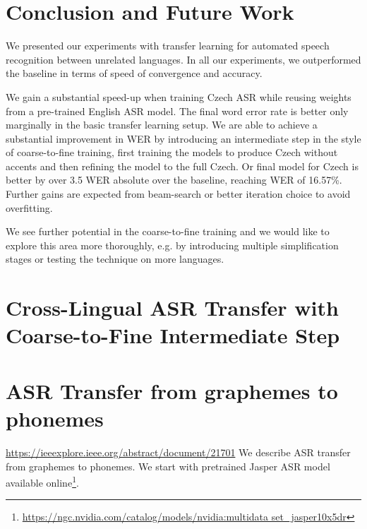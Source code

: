 \section{Conclusion and Future Work}
\label{sec:conclusion}

We presented our experiments with transfer learning for automated speech recognition between unrelated languages.
In all our experiments, we outperformed the baseline in terms of speed of convergence and accuracy.

We gain a substantial speed-up when training Czech ASR while reusing weights from a pre-trained English ASR model. The final word error rate is better only marginally in the basic transfer learning setup.
%
We are able to achieve a substantial improvement in WER by introducing an intermediate step in the style of coarse-to-fine training, first training the models to produce Czech without accents and then refining the model to the full Czech.
Or final model for Czech is better by over 3.5 WER absolute over the baseline, reaching WER of 16.57\%. Further gains are expected from beam-search or better iteration choice to avoid overfitting.


We see further potential in the coarse-to-fine training and we would like to explore this area more thoroughly, e.g. by introducing multiple simplification stages or testing the technique on more languages.

\section{Cross-Lingual ASR Transfer with Coarse-to-Fine Intermediate Step}


\section{ASR Transfer from graphemes to phonemes}
\url{https://ieeexplore.ieee.org/abstract/document/21701}
We describe ASR transfer from graphemes to phonemes. We start with pretrained Jasper ASR model available online\footnote{\url{https://ngc.nvidia.com/catalog/models/nvidia:multidata set_jasper10x5dr}}.



